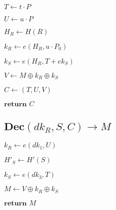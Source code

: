 \documentclass[a4paper]{article}
\begin{document}
$T \gets t \cdot P$

$U \gets u \cdot P$

$H_R \gets H(R)$

$k_R \gets e(H_R, u \cdot P_0)$

$k_S \gets e(H_R, T + \textit{ek}_S)$

$V \gets M \oplus k_R \oplus k_S$

$C \gets (T, U, V)$

$\textbf{return }C$

\subsection{$\textbf{Dec}(\textit{dk}_R, S, C) \rightarrow M$}

$k_R \gets e(\textit{dk}_1, U)$

$H'_S \gets H'(S)$

$k_S \gets e(\textit{dk}_3, T)$

$M \gets V \oplus k_R \oplus k_S$

$\textbf{return }M$
\end{document}
